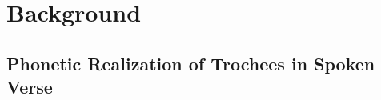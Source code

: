 \chapter{Background}


\section{Phonetic Realization of Trochees in Spoken Verse} 


%
%
%
%
%
%
%
%
%
%
%
%
%
%
%
%
%
%
